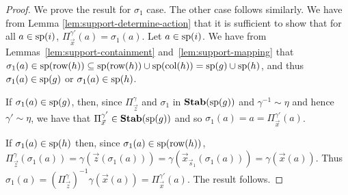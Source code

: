\documentclass[../paper.tex]{subfiles}
\begin{document}
\begin{proof}

  We prove the result for $\sigma_1$ case. The other case follows similarly. We
  have from Lemma \ref{lem:support-determine-action} that it is sufficient to
  show that for all $a \in \text{sp}(i)$, $\Pi^{\gamma'}_{\vec{x}} (a) = \sigma_1
  (a)$. Let $a \in \text{sp}(i)$. We have from Lemmas~\ref{lem:support-containment}
  and~\ref{lem:support-mapping} that $\sigma_1 (a) \in \text{sp}(\text{row}(h)) \subseteq
  \text{sp}(\text{row}(h))\cup \text{sp}(\text{col}(h)) = \text{sp}(g) \cup \text{sp}(h)$, and thus
  $\sigma_1(a) \in \text{sp}(g)$ or $\sigma_1(a) \in \text{sp}(h)$.
  
  If $\sigma_1(a) \in \text{sp}(g)$, then, since $\Pi^{\gamma}_{\vec{z}}$ and
  $\sigma_1$ in $\text{\textbf{Stab}} (\text{sp} (g))$ and $\gamma^{-1} \sim \eta$ and hence $\gamma' \sim
  \eta$, we have that $\Pi^{\gamma'}_{\vec{x}} \in \text{\textbf{Stab}} (\text{sp} (g))$ and so
  $\sigma_1(a) = a = \Pi^{\gamma'}_{\vec{x}}(a)$.

  If $\sigma_1(a) \in \text{sp}(h)$ then, since $\sigma_1(a) \in \text{sp}(\text{row}(h))$,
  $\Pi^{\gamma}_{\vec{z}}(\sigma_1(a)) = \gamma(\vec{z}(\sigma_1(a))) =
  \gamma(\vec{x}_{\vec{s}_1}(\sigma_1(a))) = \gamma (\vec{x}(a))$. Thus
  $\sigma_1 (a) = (\Pi^{\gamma}_{\vec{z}})^{-1}\gamma (\vec{x}(a)) =
  \Pi^{\gamma'}_{\vec{x}}(a)$. The result follows.
  


\end{proof}
\end{document}
